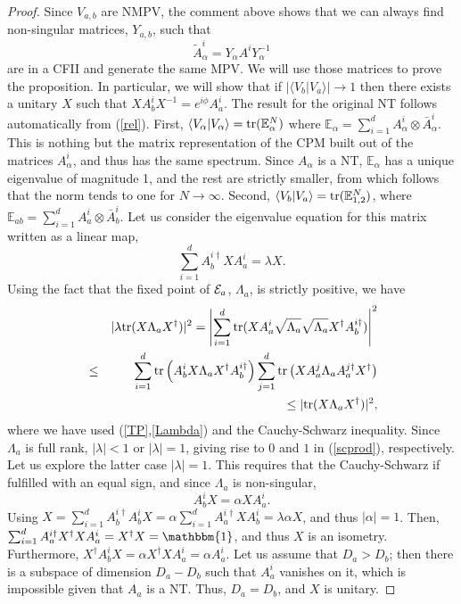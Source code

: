 \documentclass{elsarticle}
\newcommand{\Id}{\mathbbm{1}}
\newcommand{\be}{\begin{equation}}
\newcommand{\ee}{\end{equation}}
\newcommand{\bea}{\begin{eqnarray}}
\newcommand{\eea}{\end{eqnarray}}
\begin{document}
\begin{proof}
    Since  $V_{a,b}$ are NMPV, the comment above shows that we can always find non-singular matrices, $Y_{a,b}$, such that
    \be
        \label{rel}
        \tilde A^i_\alpha=Y_\alpha A^i Y_\alpha^{-1}
    \ee
    are in a CFII and generate the same MPV. We will use those matrices to prove the proposition. In particular, we will show that if $|\langle V_b|V_a\rangle|\to 1$ then there exists a unitary $X$ such that $X A^i_b X^{-1}= e^{i\phi} A^i_a$. The result for the original NT follows automatically from (\ref{rel}). First, $\langle V_\alpha|V_\alpha\rangle={\rm tr}(\mathbb{E}_\alpha^N)$ where $\mathbb{E}_\alpha=\sum_{i=1}^d A_\alpha^i\otimes \bar A_\alpha^i$. This is nothing but the matrix representation of the CPM built out of the matrices $A^i_\alpha$, and thus has the same spectrum. Since $A_\alpha$ is a NT, $\mathbb{E}_\alpha$ has a unique eigenvalue of magnitude 1, and the rest are strictly smaller, from which follows that the norm tends to one for $N\to\infty$. Second, $\langle V_b|V_a\rangle={\rm tr}(\mathbb{E}_{1,2}^N)$, where
    $\mathbb{E}_{ab}=\sum_{i=1}^d A_a^i\otimes \bar A_b^i$. Let us consider the eigenvalue equation for this matrix written as a linear map,
    \be
        \sum_{i=1}^d A_b^{i\dagger} X A_a^{i}=\lambda X.
    \ee
    Using the fact that the fixed point of ${\cal E}_a$, $\Lambda_a$, is strictly positive, we have
    \bea
        &&|\lambda {\rm tr}(X \Lambda_a X^\dagger)|^2 = \left|\sum_{i=1}^d {\rm tr}(X A^i_a \sqrt{\Lambda_a} \sqrt{\Lambda_a} X^\dagger A_b^{i\dagger})\right|^2 \nonumber\\
        &\le& \sum_{i=1}^d {\rm tr}\left(A^i_b X \Lambda_a X^\dagger A_b^{i\dagger}\right)
        \sum_{j=1}^d {\rm tr}\left(X A^j_a \Lambda_a A_a^{j\dagger}X^\dagger\right)\nonumber\\
        && \le |{\rm tr}(X\Lambda_a X^\dagger)|^2,\nonumber
    \eea
    where we have used (\ref{TP},\ref{Lambda}) and the Cauchy-Schwarz inequality. Since $\Lambda_a$ is full rank, $|\lambda|< 1$ or $|\lambda|=1$, giving rise to $0$ and $1$ in (\ref{scprod}), respectively. Let us explore the latter case $|\lambda|=1$. This requires that the Cauchy-Schwarz if fulfilled with an equal sign, and since $\Lambda_a$ is non-singular,
    \be
        A^i_b X = \alpha X A^i_a.
    \ee
    Using $X=\sum_{i=1}^d A^{i\dagger}_b A^i_b X =\alpha \sum_{i=1}^d A^{i\dagger}_aXA^i_b=\lambda \alpha X$, and thus $|\alpha|=1$. Then, $\sum_{i=1}^d A^{i\dagger}_aX^\dagger X A^i_a=X^\dagger X =\Id$, and thus $X$ is an isometry. Furthermore, $X^\dagger A_b^i X = \alpha X^\dagger X A^i_a=\alpha A^i_a$. Let us assume that $D_a> D_b$; then there is a subspace
    of dimension $D_a-D_b$ such that $A^i_a$ vanishes on it, which is impossible given that $A_a$ is a NT. Thus, $D_a=D_b$, and $X$ is unitary.
\end{proof}
\end{document}
